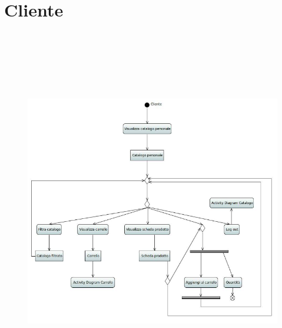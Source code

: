 \documentclass[a4paper,12pt]{report}
\begin{document}
	\section*{Cliente}
	\begin{figure}[h]
		\centering
		\includegraphics[width=\textwidth, height=16cm]{Activity_Cliente}
	\end{figure}
	
	\newpage
\end{document}
